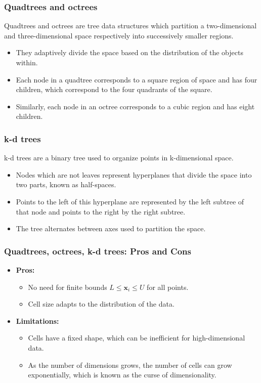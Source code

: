 \documentclass[12pt]{article}
\begin{document}
\subsubsection{Quadtrees and octrees}
Quadtrees and octrees are tree data structures which partition a two-dimensional and three-dimensional space respectively into successively smaller regions.

\begin{itemize}
    \item They adaptively divide the space based on the distribution of the objects within.
    \item Each node in a quadtree corresponds to a square region of space and has four children, which correspond to the four quadrants of the square.
    \item Similarly, each node in an octree corresponds to a cubic region and has eight children.
\end{itemize}

\subsubsection{k-d trees}
k-d trees are a binary tree used to organize points in k-dimensional space.

\begin{itemize}
    \item Nodes which are not leaves represent hyperplanes that divide the space into two parts, known as half-spaces.
    \item Points to the left of this hyperplane are represented by the left subtree of that node and points to the right by the right subtree.
    \item The tree alternates between axes used to partition the space.
\end{itemize}


\subsubsection{Quadtrees, octrees, k-d trees: Pros and Cons}
\begin{itemize}
    \item \textbf{Pros:}
    \begin{itemize}
        \item No need for finite bounds $L \leq \mathbf{x}_i \leq U$ for all points.
        \item Cell size adapts to the distribution of the data.
    \end{itemize}
    \item \textbf{Limitations:}
    \begin{itemize}
        \item Cells have a fixed shape, which can be inefficient for high-dimensional data.
        \item As the number of dimensions grows, the number of cells can grow exponentially, which is known as the curse of dimensionality.
    \end{itemize}
\end{itemize}
\end{document}
